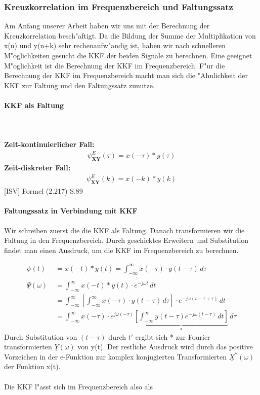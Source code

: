 \subsubsection{Kreuzkorrelation im Frequenzbereich und Faltungssatz}
Am Anfang unserer Arbeit haben wir uns mit der Berechnung der Kreuzkorrelation besch"aftigt. Da die Bildung der Summe der Multiplikation von x(n) und y(n+k) sehr rechenaufw"andig ist, haben wir nach schnelleren M"oglichkeiten gesucht die KKF der beiden Signale zu berechnen. Eine geeignet M"oglichkeit ist die Berechnung der KKF im Frequenzbereich. F"ur die Berechnung der KKF im Frequenzbereich macht man sich die "Ahnlichkeit der KKF zur Faltung und den Faltungssatz zunutze.

\paragraph{KKF als Faltung}
\textbf{\\\\Zeit-kontinuierlicher Fall:}
\begin{align}
\psi_{\textbf {XY}}^E(\tau) = x(-\tau) * y(\tau)
\end{align}
\textbf{Zeit-diskreter Fall:}
\begin{align}
\psi_{\textbf {XY}}^E(k) = x(-k) * y(k)
\end{align}
[ISV] Formel (2.217) S.89

\paragraph{Faltungssatz in Verbindung mit KKF}

Wir schreiben zuerst die die KKF als Faltung. Danach transformieren wir die Faltung in den Frequenzbereich. Durch geschicktes Erweitern und Substitution findet man einen Ausdruck, um die KKF im Frequenzbereich zu berechnen.

\begin{align}
\psi(t) \  \; &= x(-t) * y(t) = \int_{-\infty}^{\infty} x(-\tau) \cdot y(t-\tau)\,d\tau\\\\
\underline \Psi(\omega) &=\int_{-\infty}^{\infty} x(-t) * y(t) \cdot e^{-j\omega t} \,dt\\&=\int_{-\infty}^{\infty} \left[ \int_{-\infty}^{\infty} x(-\tau) \cdot y(t-\tau)\,d\tau \right] \cdot e^{-j\omega (t - \tau + \tau)} \,dt\\&=\int_{-\infty}^{\infty} x(-\tau) \cdot e^{j\omega(-\tau)} \underbrace{ \left[ \int_{-\infty}^{\infty} y(t-\tau) e^{-j\omega (t - \tau)} \,dt \right]}_* \,d\tau
\end{align}
Durch Substitution von $(t-\tau)$ durch $t'$ ergibt sich * zur Fourier-transformierten $ \underline{Y}(\omega)$ von y(t). Der restliche Ausdruck wird durch das positive Vorzeichen in der e-Funktion zur komplex konjugierten Transformierten $ \underline{X}^*(\omega)$ der Funktion x(t).
\\\\
Die KKF l"asst sich im Frequenzbereich also als

